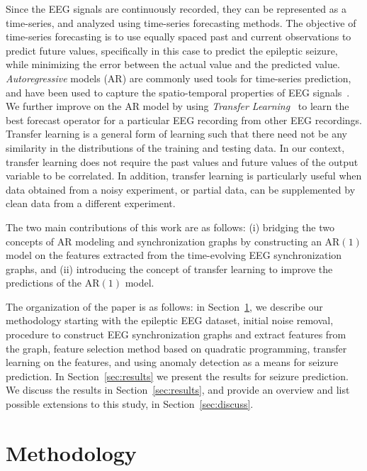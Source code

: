 \documentclass{article} %
\begin{document}
Since the EEG signals are continuously recorded, they can be represented as a time-series, and analyzed using time-series forecasting methods.  The objective of time-series forecasting is to use equally spaced past and current observations to predict future values, specifically in this case to predict the epileptic seizure, while minimizing the error between the actual value and the predicted value.  {\em Autoregressive} models (AR) are commonly used tools for time-series prediction, and have been used to capture the spatio-temporal properties of  EEG signals~\cite{anderson_offline_ar,subasi_EEG_AR}.  We further improve on the AR model by using {\em Transfer Learning}~\cite{transfer_learning_survey} to learn the best forecast operator for a particular EEG recording from other EEG recordings.  Transfer learning is a general form of learning such that there need not be any similarity in the distributions of the training and testing data.  In our context, transfer learning does not require the past values and future values of the output variable to be correlated.  In addition, transfer learning is particularly useful when data obtained from a noisy experiment, or partial data, can be supplemented by clean data from a different experiment.

The two main contributions of this work are as follows: (i) bridging the two concepts of AR modeling and synchronization graphs by constructing an AR$(1)$ model on the features extracted from the time-evolving EEG synchronization graphs,  and (ii) introducing the concept of transfer learning to improve the predictions of the AR$(1)$ model.

The organization of the paper is as follows: in Section~\ref{sec:method}, we describe our methodology starting with the epileptic EEG dataset, initial noise removal, procedure to construct EEG synchronization graphs and extract features from the graph, feature selection method based on quadratic programming, transfer learning on the features, and using anomaly detection as a means for seizure prediction.  In Section~\ref{sec:results} we present the results for seizure prediction.  We discuss the results in Section~\ref{sec:results}, and provide an overview and list possible extensions to this study, in Section~\ref{sec:discuss}.

\section{Methodology} \label{sec:method}
\end{document}
